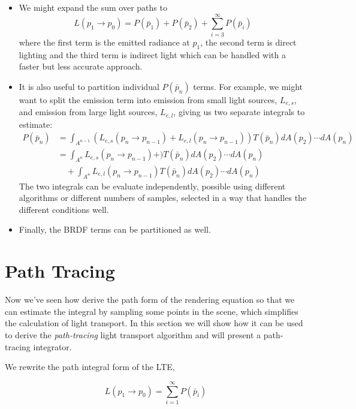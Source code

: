 \begin{itemize}
	\item We might expand the sum over paths to 
	\begin{equation*}
		L(p_1\to p_0)=P(\bar{p}_1)+P(\bar{p}_2)+\sum_{i=3}^{\infty}P(\bar{p}_i)
	\end{equation*}
	where the first term is the emitted radiance at $p_1$, the second term is direct lighting and the third term is indirect light which can be handled with a faster but less accurate approach.
	\item It is also useful to partition individual $P(\bar{p}_n)$ terms. For example, we might want to split the emission term into emission from small light sources, $L_{e,s}$, and emission from large light sources, $L_{e,l}$, giving us two separate integrals to estimate:
	\begin{equation*}
		\begin{aligned}
			P(\bar{p}_n)&=\int_{A^{n-1}}(L_{e,s}(p_n\to p_{n-1})+L_{e,l}(p_n\to p_{n-1}))T(\bar{p}_n)dA(p_2)\cdots dA(p_n)\\
			&=\int_{A^{n}}L_{e,s}(p_n\to p_{n-1})+)T(\bar{p}_n)dA(p_2)\cdots dA(p_n)\\
			&\quad +\int_{A^{n}}L_{e,l}(p_n\to p_{n-1})T(\bar{p}_n)dA(p_2)\cdots dA(p_n)
		\end{aligned}
	\end{equation*}
	The two integrals can be evaluate independently, possible using different algorithms or different numbers of samples, selected in a way that handles the different conditions well.
	\item Finally, the BRDF terms can be partitioned as well.
\end{itemize}




\section{Path Tracing}
Now we've seen how derive the path form of the rendering equation so that we can estimate the integral by sampling some points in the scene, which simplifies the calculation of light transport. In this section we will show how it can be used to derive the \textit{path-tracing} light transport algorithm and will present a path-tracing integrator.

We rewrite the path integral form of the LTE,

\begin{equation}
	L(p_1\to p_0)=\sum_{i=1}^{\infty}P(\bar{p}_i)
\end{equation}

